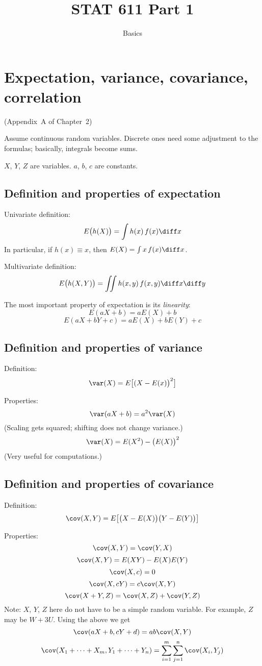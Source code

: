 \documentclass[12pt]{article}
\begin{document}
\title{STAT 611 Part 1}
\subtitle{Basics}
\maketitle

\section{Expectation, variance, covariance, correlation}
(Appendix~A of Chapter~2)

Assume continuous random variables.
Discrete ones need some adjustment to the formulas;
basically, integrals become sums.

$X$, $Y$, $Z$ are variables.
$a$, $b$, $c$ are constants.

\subsection{Definition and properties of expectation}

Univariate definition:
\[
E\bigl(h(X)\bigr)
= \int h(x)\, f(x) \diff x
\]
In particular, if $h(x) \equiv x$, then
$E(X) = \int x\, f(x) \diff x$.

Multivariate definition:
\[
E\bigl(h(X,Y)\bigr)
= \iint h(x,y)\, f(x,y)\diff x\diff y
\]

The most important property of expectation is its
\emph{linearity}:
\[
E(aX + b) = aE(X) + b
\]
\[
E(aX + bY + c) = aE(X) + bE(Y) + c
\]

\subsection{Definition and properties of variance}

Definition:
\[
\var(X)
= E\bigl[(X - E(x)\bigr)^2\bigr]
\]

Properties:
\[
\var(aX + b) = a^2 \var(X)
\]
(Scaling gets squared; shifting does not change variance.)
\[
\var(X) = E(X^2) - \bigl(E(X)\bigr)^2
\]
(Very useful for computations.)

\subsection{Definition and properties of covariance}

Definition:
\[
\cov(X,Y)
= E\bigl[\bigl(X-E(X)\bigr) \bigl(Y-E(Y)\bigr)\bigr]
\]

Properties:
\[
\cov(X,Y) = \cov(Y,X)
\]
\[
\cov(X,Y)
= E(XY) - E(X)E(Y)
\]
\[
\cov(X,c) = 0
\]
\[
\cov(X,cY) = c\cov(X,Y)
\]
\[
\cov(X+Y, Z) = \cov(X,Z) + \cov(Y,Z)
\]
Note: $X$, $Y$, $Z$ here do not have to be a simple random variable.
For example, $Z$ may be $W + 3U$.
Using the above we get
\[
\cov(aX+b, cY+d) = ab\cov(X,Y)
\]
\[
\cov(X_1+\dotsb+X_m, Y_1+\dotsb+Y_n)
= \sum_{i=1}^m\sum_{j=1}^n \cov(X_i, Y_j)
\]
\end{document}
